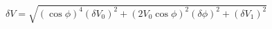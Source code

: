 \begin{equation}
\label{eq:delta_V_Malus}
\delta V = \sqrt{ \left(\cos{\phi}\right)^4(\delta V_0)^2 + \left(2V_0 \cos{\phi} \right)^2(\delta \phi)^2+ (\delta V_1)^2}
\end{equation}